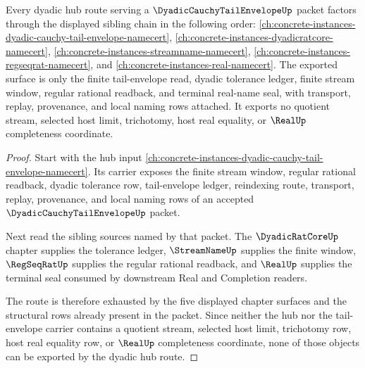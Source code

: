 \begin{theorem}
\label{thm:dyadic-core-sibling-route}
Every dyadic hub route serving a $\DyadicCauchyTailEnvelopeUp$ packet factors through the displayed sibling chain in the following order: \autoref{ch:concrete-instances-dyadic-cauchy-tail-envelope-namecert}, \autoref{ch:concrete-instances-dyadicratcore-namecert}, \autoref{ch:concrete-instances-streamname-namecert}, \autoref{ch:concrete-instances-regseqrat-namecert}, and \autoref{ch:concrete-instances-real-namecert}.
The exported surface is only the finite tail-envelope read, dyadic tolerance ledger, finite stream window, regular rational readback, and terminal real-name seal, with transport, replay, provenance, and local naming rows attached. It exports no quotient stream, selected host limit, trichotomy, host real equality, or $\RealUp$ completeness coordinate.
\end{theorem}
\begin{proof}
Start with the hub input \autoref{ch:concrete-instances-dyadic-cauchy-tail-envelope-namecert}. Its carrier exposes the finite stream window, regular rational readback, dyadic tolerance row, tail-envelope ledger, reindexing route, transport, replay, provenance, and local naming rows of an accepted $\DyadicCauchyTailEnvelopeUp$ packet.

Next read the sibling sources named by that packet. The $\DyadicRatCoreUp$ chapter supplies the tolerance ledger, $\StreamNameUp$ supplies the finite window, $\RegSeqRatUp$ supplies the regular rational readback, and $\RealUp$ supplies the terminal seal consumed by downstream Real and Completion readers.

The route is therefore exhausted by the five displayed chapter surfaces and the structural rows already present in the packet. Since neither the hub nor the tail-envelope carrier contains a quotient stream, selected host limit, trichotomy row, host real equality row, or $\RealUp$ completeness coordinate, none of those objects can be exported by the dyadic hub route.
\end{proof}
